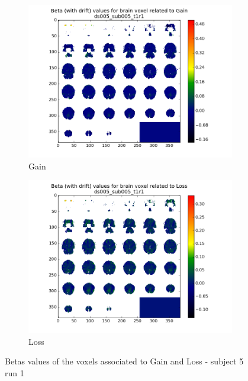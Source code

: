 \begin{figure}[H]
\begin{subfigure}{.5\textwidth}
  \centering
  \includegraphics[width=.9\linewidth]{../fig/mosaic/ds005_sub005_t1r1_withdrift_Gain.png}
  \caption{Gain}
  \label{fig:fig1}
\end{subfigure}%
\begin{subfigure}{.5\textwidth}
  \centering
  \includegraphics[width=.9\linewidth]{../fig/mosaic/ds005_sub005_t1r1_withdrift_Loss.png}
  \caption{Loss}
  \label{fig:fig2}
\end{subfigure}
\caption{Betas values of the voxels associated to Gain and Loss - subject 5 run 1}
\label{fig:figa}
\end{figure}


